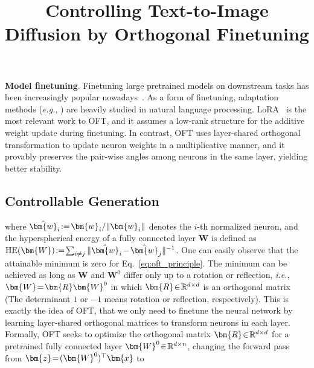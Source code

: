 \title{Controlling Text-to-Image Diffusion by Orthogonal Finetuning}
\textbf{Model finetuning}. Finetuning large pretrained models on downstream tasks has been increasingly popular nowadays~\cite{devlin2018bert,brown2020language,he2022masked}. As a form of finetuning, adaptation methods (\emph{e.g.}, \cite{hulora2022,houlsby2019parameter,pfeiffer2020adapterfusion}) are heavily studied in natural language processing. LoRA~\cite{hulora2022} is the most relevant work to OFT, and it assumes a low-rank structure for the additive weight update during finetuning. In contrast, OFT uses layer-shared orthogonal transformation to update neuron weights in a multiplicative manner, and it provably preserves the pair-wise angles among neurons in the same layer, yielding better stability.

\subsection{Controllable Generation}

where $\thickmuskip=2mu \medmuskip=2mu \hat{\bm{w}}_i:=\bm{w}_i/\|\bm{w}_i\|$ denotes the $i$-th normalized neuron, and the hyperspherical energy of a fully connected layer $\bm{W}$ is defined as $\thickmuskip=2mu \medmuskip=2mu \text{HE}(\bm{W}):= \sum_{i\neq j} \|\hat{\bm{w}}_i-\hat{\bm{w}}_j\|^{-1}$. One can easily observe that the attainable minimum is zero for Eq.~\eqref{eq:oft_principle}. The minimum can be achieved as long as $\bm{W}$ and $\bm{W}^0$ differ only up to a rotation or reflection, \emph{i.e.}, $\thickmuskip=2mu \medmuskip=2mu \bm{W}=\bm{R}\bm{W}^0$ in which $\thickmuskip=2mu \medmuskip=2mu \bm{R}\in\mathbb{R}^{d\times d}$ is an orthogonal matrix (The determinant $1$ or $-1$ means rotation or reflection, respectively). This is exactly the idea of OFT, that we only need to finetune the neural network by learning layer-shared orthogonal matrices to transform neurons in each layer. Formally, OFT seeks to optimize the orthogonal matrix $\thickmuskip=2mu \medmuskip=2mu \bm{R}\in\mathbb{R}^{d \times d}$ for a pretrained fully connected layer $\thickmuskip=2mu \medmuskip=2mu\bm{W}^0\in\mathbb{R}^{d\times n}$, changing the forward pass from $\thickmuskip=2mu \medmuskip=2mu\bm{z}=(\bm{W}^0)^\top\bm{x}$ to

